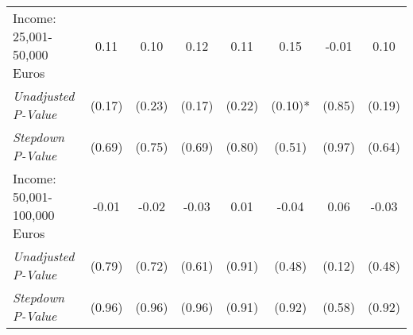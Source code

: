 \begin{tabular}{l c c c c c c c}
Income: 25,001-50,000 Euros & 0.11 & 0.10 & 0.12 & 0.11 & 0.15 & -0.01 & 0.10 \\
\quad \textit{Unadjusted P-Value} & (0.17) & (0.23) & (0.17) & (0.22) & (0.10)* & (0.85) & (0.19) \\
\quad \textit{Stepdown P-Value} & (0.69) & (0.75) & (0.69) & (0.80) & (0.51) & (0.97) & (0.64) \\
Income: 50,001-100,000 Euros & -0.01 & -0.02 & -0.03 & 0.01 & -0.04 & 0.06 & -0.03 \\
\quad \textit{Unadjusted P-Value} & (0.79) & (0.72) & (0.61) & (0.91) & (0.48) & (0.12) & (0.48) \\
\quad \textit{Stepdown P-Value} & (0.96) & (0.96) & (0.96) & (0.91) & (0.92) & (0.58) & (0.92) \\
\bottomrule
\end{tabular}
